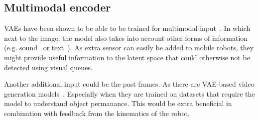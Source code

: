 \subsection{Multimodal encoder}
VAEs have been shown to be able to be trained for multimodal input~\cite{sadok2024multimodal,shi2019variational,sutter2021generalized,suzuki2016joint,wu2018multimodal}. In which next to the image, the model also takes into account other forms of information (e.g. sound~\cite{sadok2024multimodal} or text~\cite{suzuki2016joint}). As extra sensor can easily be added to mobile robots, they might provide useful information to the latent space that could otherwise not be detected using visual queues.

Another additional input could be the past frames. As there are VAE-based video generation models~\cite{yan2021videogpt}. Especially when they are trained on datasets that require the model to understand object permanance. This would be extra beneficial in combination with feedback from the kinematics of the robot.
